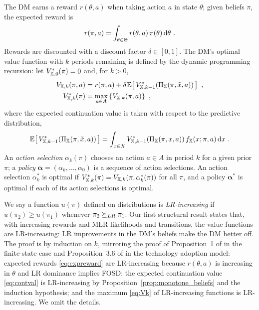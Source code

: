 The DM earns a reward $r(\theta, a)$ when taking action $a$ in state
$\theta$; given beliefs $\pi$, the expected reward is
\begin{equation}
r(\pi,a) = \int_{\theta \in \Theta} r(\theta,a)\, \pi(\theta)
  \mathop{}\!\mathrm{d} \theta \ . \label{eq:expreward}
\end{equation}
Rewards are discounted with a discount factor $\delta \in [0,1]$. The
DM's optimal value function with $k$ periods remaining is defined by the
dynamic programming recursion: let $V_{{\mathbb{X}},0}^*(\pi) = 0$ and, for
$k > 0$,
\begin{align}
V_{\iX,k}(\pi,a) &= r(\pi,a) +
  \delta \ev{V_{\iX,k-1}^*(\Pi_\iX(\pi,\tilde{x},a))} \ ,
  \label{eq:Vka}\\
V_{\iX,k}^*(\pi) &= \max_{a\in A} \left\{ V_{\iX,k}(\pi,a) \right\} \ ,
  \label{eq:Vk}
\end{align}
where the expected continuation value is taken with respect to the
predictive distribution,
\begin{equation}
\ev{V_{\iX,k-1}^*(\Pi_\iX(\pi,\tilde{x},a))}
  = \int_{x\in X} V_{\iX,k-1}^*(\Pi_\iX(\pi,x,a))\,
    f_\iX(x; \pi, a) \dif x \ . \label{eq:contval}
\end{equation}
An \emph{action selection} $\alpha_{k}(\pi)$ chooses an action
$a \in A$ in period $k$ for a given prior $\pi$; a \emph{policy}
$\boldsymbol{\alpha} = (\alpha_{k}, \ldots, \alpha_{0})$ is a sequence
of action selections. An action selection $\alpha_{k}^*$ is optimal if
$V_{{\mathbb{X}},k}^*(\pi) = V_{{\mathbb{X}},k}(\pi,\alpha_{k}^*(\pi))$ for all $\pi$,
and a policy $\boldsymbol{\alpha}^*$ is optimal if each of its action
selections is optimal.

We say a function $u(\pi)$ defined on distributions is
\emph{LR-increasing} if $u(\pi_2) \geq u(\pi_1)$ whenever
$\pi_2 \succeq_{LR} \pi_1$. Our first structural result states that, with
increasing rewards and MLR likelihoods and transitions, the value
functions are LR-increasing: LR improvements in the DM's beliefs make
the DM better off. The proof is by induction on $k$, mirroring the
proof of Proposition~1 of \citet{lovejoy1987some} in the finite-state
case and Proposition~3.6 of \citet{ulu2009uncertainty} in the technology
adoption model: expected rewards \eqref{eq:expreward} are LR-increasing
because $r(\theta,a)$ is increasing in $\theta$ and LR dominance implies
FOSD; the expected continuation value \eqref{eq:contval} is
LR-increasing by Proposition~\ref{prop:monotone_beliefs} and the
induction hypothesis; and the maximum \eqref{eq:Vk} of LR-increasing
functions is LR-increasing. We omit the details.

